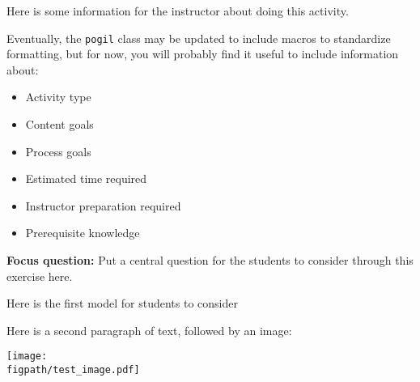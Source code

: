 %
%
%
%

\renewcommand{\figpath}{content}

\begin{activity}

\begin{instructornotes}
	Here is some information for the instructor about doing this activity.
	
	Eventually, the \verb!pogil! class may be updated to include macros to standardize formatting, but for now, you will probably find it useful to include information about:
	
	\begin{itemize}
		\item Activity type
		\item Content goals
		\item Process goals
		\item Estimated time required
		\item Instructor preparation required
		\item Prerequisite knowledge
	\end{itemize}
	
\end{instructornotes}

	\textbf{Focus question:} Put a central question for the students to consider through this exercise here.



\begin{model}[ABC]

	Here is the first model for students to consider

	Here is a second paragraph of text, followed by an image:

	\centerline{\texttt{[image: \\figpath/test\_image.pdf]}}

\end{model}


\begin{ctqs}


\end{ctqs}
\end{activity}
